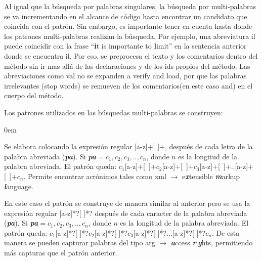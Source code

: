 \documentclass[a4paper,12pt]{report}
\begin{document}
Al igual que la búsqueda por palabras singulares, la búsqueda por multi-palabras se va incrementando en el alcance de código hasta encontrar un candidato que coincida con el patrón. Sin embargo, es importante tener en cuenta hasta donde los patrones multi-palabras realizan la búsqueda. Por ejemplo, una abreviatura \textsf{il} puede coincidir con la frase “\textbf{i}t is importante to \textbf{l}imit” en la sentencia anterior donde se encuentra \textsf{il}. Por eso, se preprocesa el texto y los comentarios dentro del método sin ir mas allá de las declaraciones y de los ids propios del método.
 Las abreviaciones como \textsf{val} no se expanden a \textsf{verify and load}, por que las palabras irrelevantes (stop words) se remueven de los comentarios(en este caso \textsf{and}) en el cuerpo del método.

Los patrones utilizados en las búsquedas multi-palabras se construyen:

\begin{description}
\itemsep0em%
\item[Patrón acrónimo:] Se elabora colocando la expresión regular [a-z]+[ ]+, después de cada letra de la palabra abreviada (\textit{\textbf{pa}}). Si \textit{\textbf{pa}}$=c_{1},c_{2},c_{3},..,c_{n}$, donde $n$ es la longitud de la palabra abreviada. El patrón queda: \mbox{$c_{1}$[a-z]+[ ]+$c_{2}$[a-z]+[ ]+$c_{3}$[a-z]+[ ]+..[a-z]+[ ]+$c_{n}$}. Permite encontrar acrónimos tales como \textsf{xml} $\rightarrow$ e\textbf{\textit{x}}tensible \textbf{\textit{m}}arkup \textbf{\textit{l}}anguage.

\item[Patrón de Combinación de Palabras:] En este caso el patrón se construye de manera similar al anterior pero se usa la expresión regular [a-z]*?[ ]*? después de cada caracter de la palabra abreviada (\textit{\textbf{pa}}). Si \textit{\textbf{pa}}$=c_{1},c_{2},c_{3},..,c_{n}$, donde $n$ es la longitud de la palabra abreviada. El patrón queda: $c_{1}$[a-z]*?[ ]*?$c_{2}$[a-z]*?[ ]*?$c_{3}$[a-z]*?[ ]*?...[a-z]*?[ ]*?$c_{n}$. De esta manera se pueden capturar palabras del tipo \textsf{arg} $\rightarrow$ \textbf{\textit{a}}ccess \textbf{\textit{r}}i\textbf{\textit{g}}hts, permitiendo más capturas que el patrón anterior.
\end{description}


\end{document}

